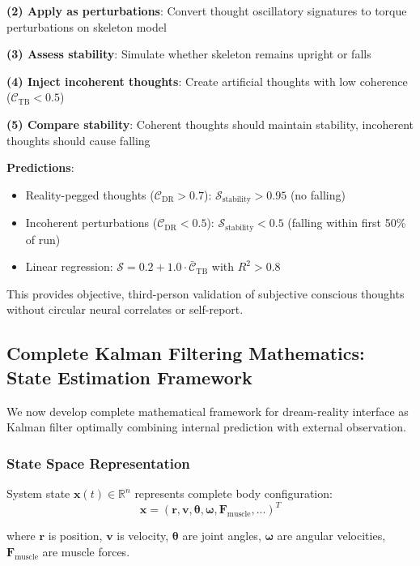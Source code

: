 \documentclass[11pt,onecolumn]{article}
\begin{document}
\textbf{(2) Apply as perturbations}: Convert thought oscillatory signatures to torque perturbations on skeleton model

\textbf{(3) Assess stability}: Simulate whether skeleton remains upright or falls

\textbf{(4) Inject incoherent thoughts}: Create artificial thoughts with low coherence ($\mathcal{C}_{\text{TB}} < 0.5$)

\textbf{(5) Compare stability}: Coherent thoughts should maintain stability, incoherent thoughts should cause falling

\textbf{Predictions}:
\begin{itemize}
\item Reality-pegged thoughts ($\mathcal{C}_{\text{DR}} > 0.7$): $\mathcal{S}_{\text{stability}} > 0.95$ (no falling)
\item Incoherent perturbations ($\mathcal{C}_{\text{DR}} < 0.5$): $\mathcal{S}_{\text{stability}} < 0.5$ (falling within first 50\% of run)
\item Linear regression: $\mathcal{S} = 0.2 + 1.0 \cdot \bar{\mathcal{C}}_{\text{TB}}$ with $R^2 > 0.8$
\end{itemize}

This provides objective, third-person validation of subjective conscious thoughts without circular neural correlates or self-report.

\subsection{Complete Kalman Filtering Mathematics: State Estimation Framework}

We now develop complete mathematical framework for dream-reality interface as Kalman filter optimally combining internal prediction with external observation.

\subsubsection{State Space Representation}

System state $\mathbf{x}(t) \in \mathbb{R}^n$ represents complete body configuration:
\begin{equation}
\mathbf{x} = (\mathbf{r}, \mathbf{v}, \boldsymbol{\theta}, \boldsymbol{\omega}, \mathbf{F}_{\text{muscle}}, ...)^T
\end{equation}

where $\mathbf{r}$ is position, $\mathbf{v}$ is velocity, $\boldsymbol{\theta}$ are joint angles, $\boldsymbol{\omega}$ are angular velocities, $\mathbf{F}_{\text{muscle}}$ are muscle forces.
\end{document}
